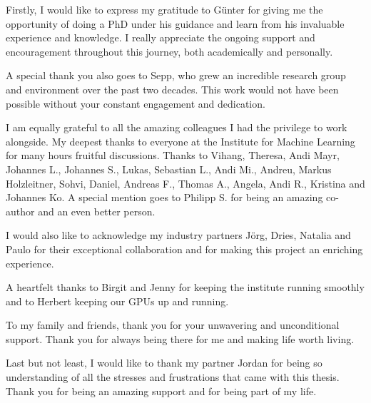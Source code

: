 %

Firstly, I would like to express my gratitude to Günter for giving me the opportunity of doing a PhD under his guidance
and learn from his invaluable experience and knowledge. I really appreciate the ongoing support and encouragement
throughout this journey, both academically and personally. 

A special thank you also goes to Sepp, who grew an incredible research group and environment over the past two decades.
This work would not have been possible without your constant engagement and dedication. 

I am equally grateful to all the amazing colleagues I had the privilege to work alongside. My deepest thanks to everyone
at the Institute for Machine Learning for many hours fruitful discussions. Thanks to Vihang, Theresa, Andi Mayr,
Johannes L., Johannes S., Lukas, Sebastian L., Andi Mi., Andreu, Markus Holzleitner, Sohvi, Daniel, Andreas F., Thomas
A., Angela, Andi R., Kristina and Johannes Ko. A special mention goes to Philipp S. for being an amazing co-author and
an even better person.

I would also like to acknowledge my industry partners Jörg, Dries, Natalia and Paulo for their exceptional collaboration
and for making this project an enriching experience.

A heartfelt thanks to Birgit and Jenny for keeping the institute running smoothly 
and to Herbert keeping our GPUs up and running.

To my family and friends, thank you for your unwavering and unconditional support. Thank you for always being there for me 
and making life worth living.

Last but not least, I would like to thank my partner Jordan for being so understanding of all the stresses and
frustrations that came with this thesis. Thank you for being an amazing support and for being part of my life.

